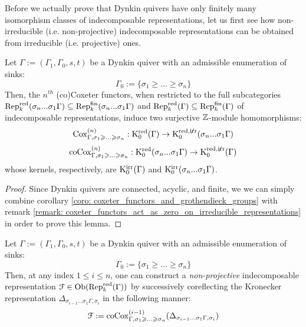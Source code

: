             Before we actually prove that Dynkin quivers have only finitely many isomorphism classes of indecomposable representations, let us first see how non-irreducible (i.e. non-projective) indecomposable representations can be obtained from irreducible (i.e. projective) ones.
            \begin{lemma} \label{lemma: coxeter_functors_are_essentially_surjective_on_indecomposable_representations}
                Let $\Gamma := (\Gamma_1, \Gamma_0, s, t)$ be a Dynkin quiver with an admissible enumeration of sinks:
                    $$\Gamma_0 := \{\sigma_1 \geq ... \geq \sigma_n\}$$
                Then, the $n^{th}$ (co)Coxeter functors, when restricted to the full subcategories $\mathrm{Rep}_k^{\mathrm{red}}(\sigma_n ... \sigma_1\Gamma) \subseteq \mathrm{Rep}_k^{\mathrm{fin}}(\sigma_n ... \sigma_1\Gamma)$ and $\mathrm{Rep}_k^{\mathrm{red}}(\Gamma) \subseteq \mathrm{Rep}_k^{\mathrm{fin}}(\Gamma)$ of indecomposable representations, induce two surjective $\mathbb{Z}$-module homomorphisms:
                    $$\mathrm{Cox}_{\Gamma, \sigma_1 \geqslant ...\geqslant \sigma_n}^{(n)}: \mathrm{K}_0^{\mathrm{red}}(\Gamma) \to \mathrm{K}_0^{\mathrm{red}, \not \mathrm{irr}}(\sigma_n ... \sigma_1\Gamma)$$  
                    $$\mathrm{co}\mathrm{Cox}_{\Gamma, \sigma_1 \geqslant ...\geqslant \sigma_n}^{(n)}: \mathrm{K}_0^{\mathrm{red}}(\sigma_n ... \sigma_1\Gamma) \to \mathrm{K}_0^{\mathrm{red}, \not \mathrm{irr}}(\Gamma)$$
                whose kernels, respectively, are $\mathrm{K}_0^{\mathrm{irr}}(\Gamma)$ and $\mathrm{K}_0^{\mathrm{irr}}(\sigma_n ... \sigma_1 \Gamma)$.
            \end{lemma}
                \begin{proof}
                    Since Dynkin quivers are connected, acyclic, and finite, we we can simply combine corollary \ref{coro: coxeter_functors_and_grothendieck_groups} with remark \ref{remark: coxeter_functors_act_as_zero_on_irreducible_representations} in order to prove this lemma. 
                \end{proof}
            \begin{proposition} \label{prop: indecomposable_representations_from_irreducible_representations_through_corelfections}
                Let $\Gamma := (\Gamma_1, \Gamma_0, s, t)$ be a Dynkin quiver with an admissible enumeration of sinks:
                    $$\Gamma_0 := \{\sigma_1 \geq ... \geq \sigma_n\}$$
                Then, at any index $1 \leq i \leq n$, one can construct a \textit{non-projective} indecomposable representation $\mathcal{F} \in \mathrm{Ob}(\mathrm{Rep}_k^{\mathrm{red}}(\Gamma))$ by successively coreflecting the Kronecker representation $\Delta_{\sigma_{i - 1} ... \sigma_1 \Gamma, \sigma_i}$ in the following manner:
                    $$\mathcal{F} := \mathrm{co}\mathrm{Cox}^{(i - 1)}_{\Gamma, \sigma_1 \geqslant ... \geqslant \sigma_n}(\Delta_{\sigma_{i - 1} ... \sigma_1 \Gamma, \sigma_i})$$
            \end{proposition}
